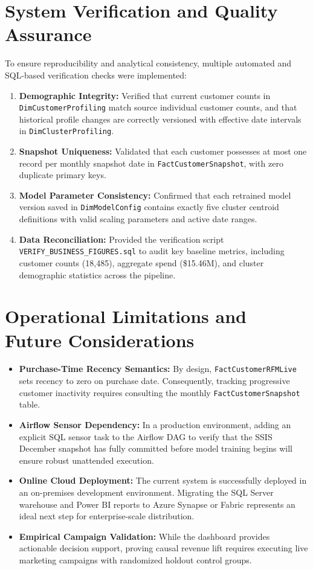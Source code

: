 \section{System Verification and Quality Assurance}
To ensure reproducibility and analytical consistency, multiple automated and SQL-based verification checks were implemented:
\begin{enumerate}
    \item \textbf{Demographic Integrity:} Verified that current customer counts in \texttt{DimCustomerProfiling} match source individual customer counts, and that historical profile changes are correctly versioned with effective date intervals in \texttt{DimClusterProfiling}.
    \item \textbf{Snapshot Uniqueness:} Validated that each customer possesses at most one record per monthly snapshot date in \texttt{FactCustomerSnapshot}, with zero duplicate primary keys.
    \item \textbf{Model Parameter Consistency:} Confirmed that each retrained model version saved in \texttt{DimModelConfig} contains exactly five cluster centroid definitions with valid scaling parameters and active date ranges.
    \item \textbf{Data Reconciliation:} Provided the verification script \texttt{VERIFY\_}\allowbreak\texttt{BUSINESS\_}\allowbreak\texttt{FIGURES.sql} to audit key baseline metrics, including customer counts (18,485), aggregate spend (\$15.46M), and cluster demographic statistics across the pipeline.
\end{enumerate}

\section{Operational Limitations and Future Considerations}
\begin{itemize}
    \item \textbf{Purchase-Time Recency Semantics:} By design, \texttt{FactCustomerRFMLive} sets recency to zero on purchase date. Consequently, tracking progressive customer inactivity requires consulting the monthly \texttt{FactCustomerSnapshot} table.
    \item \textbf{Airflow Sensor Dependency:} In a production environment, adding an explicit SQL sensor task to the Airflow DAG to verify that the SSIS December snapshot has fully committed before model training begins will ensure robust unattended execution.
    \item \textbf{Online Cloud Deployment:} The current system is successfully deployed in an on-premises development environment. Migrating the SQL Server warehouse and Power BI reports to Azure Synapse or Fabric represents an ideal next step for enterprise-scale distribution.
    \item \textbf{Empirical Campaign Validation:} While the dashboard provides actionable decision support, proving causal revenue lift requires executing live marketing campaigns with randomized holdout control groups.
\end{itemize}

